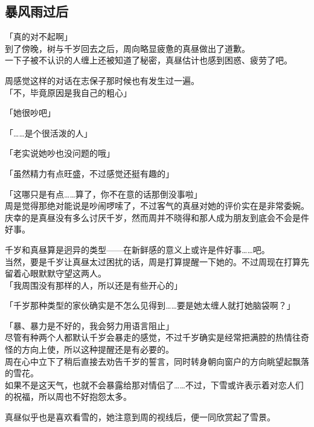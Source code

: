 \subsection{暴风雨过后}

「真的对不起啊」\\

到了傍晚，树与千岁回去之后，周向略显疲惫的真昼做出了道歉。\\

一下子被不认识的人缠上还被知道了秘密，真昼估计也感到困惑、疲劳了吧。

周感觉这样的对话在志保子那时候也有发生过一遍。\\

「不，毕竟原因是我自己的粗心」

「她很吵吧」

「……是个很活泼的人」

「老实说她吵也没问题的哦」

「虽然精力有点旺盛，不过感觉还挺有趣的」

「这哪只是有点……算了，你不在意的话那倒没事啦」\\

周是觉得那绝对能说是吵闹啰嗦了，不过客气的真昼对她的评价实在是非常委婉。\\

庆幸的是真昼没有多么讨厌千岁，然而周并不晓得和那人成为朋友到底会不会是件好事。

千岁和真昼算是迥异的类型——在新鲜感的意义上或许是件好事……吧。\\

当然，要是千岁让真昼太过困扰的话，周是打算提醒一下她的。不过周现在打算先留着心眼默默守望这两人。\\

「我周围没有那样的人，所以还是有些开心的」

「千岁那种类型的家伙确实是不怎么见得到……要是她太缠人就打她脑袋啊？」

「暴、暴力是不好的，我会努力用语言阻止」\\

尽管有种两个人都默认千岁会暴走的感觉，不过千岁确实是经常把满腔的热情往奇怪的方向上使，所以这种提醒还是有必要的。\\

周在心中立下了稍后直接去劝告千岁的誓言，同时转身朝向窗户的方向眺望起飘落的雪花。\\

如果不是这天气，也就不会暴露给那对情侣了……不过，下雪或许表示着对恋人们的祝福，所以周也不好抱怨太多。

真昼似乎也是喜欢看雪的，她注意到周的视线后，便一同欣赏起了雪景。\\

